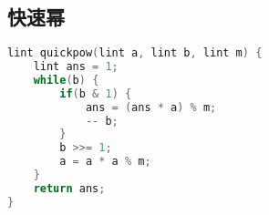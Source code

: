 \subsection{快速幂}
    \begin{lstlisting}[language=c++]
lint quickpow(lint a, lint b, lint m) {  
    lint ans = 1;  
    while(b) {  
        if(b & 1) {  
            ans = (ans * a) % m;
            -- b;
        }  
        b >>= 1;
        a = a * a % m;  
    }  
    return ans;
}  
    \end{lstlisting}
